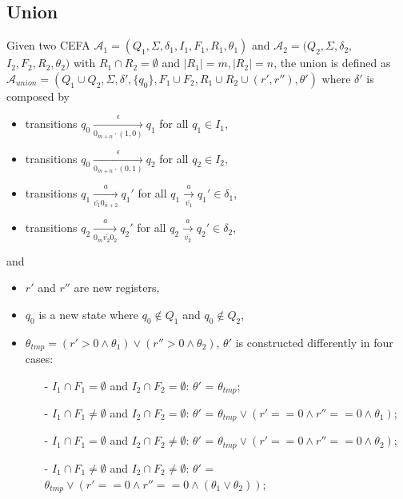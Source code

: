 \documentclass[sigconf]{acmart}
\newcommand*{\aut}{\mathcal{A}}
\begin{document}
\subsection{Union}\label{subsec:union}
Given two CEFA $\aut_1 = (Q_1, \Sigma, \delta_1, I_1, F_1, R_1, \theta_1)$ and $\aut_2 = (Q_2, \Sigma, \delta_2,$ $I_2, F_2, R_2, \theta_2)$ with $R_1\cap R_2 = \emptyset$ and $|R_1|=m,|R_2|=n$, the union is defined as $\aut_{union} = (Q_1\cup Q_2, \Sigma, \delta', \{q_0\}, F_1\cup F_2, R_1\cup R_2\cup (r', r''), \theta')$ where $\delta'$ is composed by
\begin{itemize}
  \item transitions $q_0\xrightarrow[0_{m+n}\cdot(1,0)]{\epsilon}q_1$ for all $q_1\in I_1$,
  \item transitions $q_0\xrightarrow[0_{m+n}\cdot(0,1)]{\epsilon}q_2$ for all $q_2\in I_2$,
  \item transitions $q_1\xrightarrow[\bar{v_1}0_{n+2}]{a} q_1'$ for all $q_1\xrightarrow[\bar{v_1}]{a} q_1'\in \delta_1$,
  \item transitions $q_2\xrightarrow[0_m\bar{v_2}0_2]{a} q_2'$ for all $q_2\xrightarrow[\bar{v_2}]{a} q_2'\in \delta_2$,
\end{itemize}
and 
\begin{itemize}
  \item $r'$ and $r''$ are new registers,
  \item $q_0$ is a new state where $q_0\not\in Q_1$ and $q_0\not\in Q_2$,
  \item $\theta_{tmp} = (r'>0\wedge\theta_1)\vee(r''>0\wedge\theta_2)$, $\theta'$ is constructed differently in four cases:
  \begin{itemize}
    \item [-]$I_1\cap F_1=\emptyset$ and $I_2\cap F_2=\emptyset$: $\theta'$ = $\theta_{tmp}$;
    \item [-]$I_1\cap F_1\not=\emptyset$ and $I_2\cap F_2=\emptyset$: $\theta'$ = $\theta_{tmp}\vee (r'==0\wedge r''==0\wedge\theta_1)$;
    \item [-]$I_1\cap F_1=\emptyset$ and $I_2\cap F_2\not=\emptyset$: $\theta'$ = $\theta_{tmp}\vee (r'==0\wedge r''==0\wedge\theta_2)$;
    \item [-]$I_1\cap F_1\not=\emptyset$ and $I_2\cap F_2\not=\emptyset$: $\theta'$ = $\theta_{tmp}\vee (r'==0\wedge r''==0\wedge(\theta_1\vee\theta_2))$;
  \end{itemize}
\end{itemize}
\end{document}
